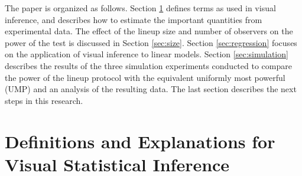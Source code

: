 \documentclass{article}
\newcommand{\blue}[1]{{\color{blue} #1}} %
\begin{document}





The paper is organized as follows. Section \ref{sec:visual_test} defines terms as used in visual inference, and describes how to estimate the important quantities from experimental data. The effect of the lineup size and number of observers on the power of the test is discussed in Section \ref{sec:size}. Section \ref{sec:regression} focuses on the application of  visual inference to linear models.  Section \ref{sec:simulation} describes the results of the three simulation experiments conducted to compare the power of the lineup protocol with the equivalent uniformly most powerful (UMP) and an analysis of the resulting data. The last section describes the next steps in this research.


\section{Definitions and Explanations for Visual Statistical Inference} \label{sec:visual_test} 
\end{document}
